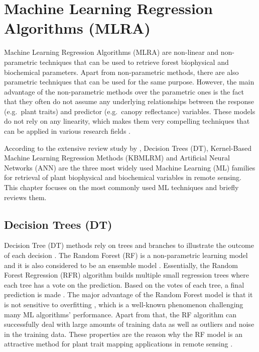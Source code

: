 \documentclass[a4paper, twoside]{templates/ociamthesis}
\begin{document}
\hypertarget{mlra}{%
\chapter{Machine Learning Regression Algorithms (MLRA)}\label{mlra}}

Machine Learning Regression Algorithms (MLRA) are non-linear and non-parametric techniques that can be used to retrieve forest biophysical and biochemical parameters. Apart from non-parametric methods, there are also parametric techniques that can be used for the same purpose. However, the main advantage of the non-parametric methods over the parametric ones is the fact that they often do not assume any underlying relationships between the response (e.g.~plant traits) and predictor (e.g.~canopy reflectance) variables. These models do not rely on any linearity, which makes them very compelling techniques that can be applied in various research fields \citep{sinha2020estimation, rivera2015emulator, verrelst2019quantifying}.

According to the extensive review study by \citet{verrelst2019quantifying}, Decision Trees (DT), Kernel-Based Machine Learning Regression Methods (KBMLRM) and Artificial Neural Networks (ANN) are the three most widely used Machine Learning (ML) families for retrieval of plant biophysical and biochemical variables in remote sensing. This chapter focuses on the most commonly used ML techniques and briefly reviews them.

\hypertarget{dt}{%
\section{Decision Trees (DT)}\label{dt}}

Decision Tree (DT) methods rely on trees and branches to illustrate the outcome of each decision \citep{verrelst2019quantifying}. The Random Forest (RF) is a non-parametric learning model and it is also considered to be an ensemble model \citep{breiman2001random}. Essentially, the Random Forest Regression (RFR) algorithm builds multiple small regression trees where each tree has a vote on the prediction. Based on the votes of each tree, a final prediction is made \citep{breiman2001random, powell2010quantification}. The major advantage of the Random Forest model is that it is not sensitive to overfitting \citep{breiman2001random, powell2010quantification, verrelst2019quantifying}, which is a well-known phenomenon challenging many ML algorithms' performance. Apart from that, the RF algorithm can successfully deal with large amounts of training data as well as outliers and noise in the training data. These properties are the reason why the RF model is an attractive method for plant trait mapping applications in remote sensing \citep{verrelst2019quantifying}.
\end{document}
